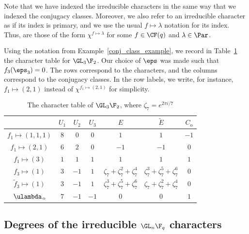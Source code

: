 Note that we have indexed the irreducible characters in the same way that we indexed the conjugacy classes.
Moreover, we also refer to an irreducible character as  if its index is primary, and we use the usual \(f \mapsto \lambda\) notation for its index.
Thus,  are those of the form \(\chi^{f \mapsto \lambda}\) for some \(f \in \CF (q)\) and \(\lambda \in \Par\).

\begin{example}
\label{runningexample}
Using the notation from Example~\ref{conj_class_example}, we record in Table~\ref{GL3F2_char_table} the character table for $\GL_3 \F_2$.
Our choice of \(\eps\) was made such that \(f_3(\eps_3) = 0\).
The rows correspond to the characters, and the columns correspond to the conjugacy classes.
In the row labels, we write, for instance, $f_1 \mapsto (2,1)$ instead of $\chi^{f_1 \mapsto (2,1)}$ for simplicity.

\begin{table}[ht]
\caption{The character table of \(\GL_3 \F_2\), where $\zeta_7 = e^{2 \pi i / 7}$}
\centering
\begin{tabular}{ c || c | c | c | c | c | c }
 & $U_1$ & $U_2$ & $U_3$ & $E$ & $\tilde{E}$ & $C_{\mathrm{o}}$ \\ \hline \hline
$f_1 \mapsto (1,1,1)$ & $8$ & $0$ & $0$ & $1$ & $1$ & $-1$  \\
$f_1 \mapsto (2,1)$ & $6$ & $2$ & $0$ & $-1$ & $-1$ & $0$ \\
$f_1 \mapsto (3)$ & $1$ & $1$ & $1$ & $1$ & $1$ & $1$ \\
$f_3 \mapsto (1)$ & $3$ & $-1$ & $1$ & $\zeta_7 + \zeta_7^2 + \zeta_7^4$ & $\zeta_7^3 + \zeta_7^5 + \zeta_7^6$ & $0$  \\
$\tilde{f}_3 \mapsto (1)$ & $3$ & $-1$ & $1$ & $\zeta_7^3 + \zeta_7^5 + \zeta_7^6$ & $\zeta_7 + \zeta_7^2 + \zeta_7^4$ & $0$  \\
$\ulambda_{\,\mathrm{o}}$ & $7$ & $-1$ & $-1$ & $0$ & $0$ & $1$  \\
\end{tabular}
\label{GL3F2_char_table}
\end{table}
\end{example}









\subsection{Degrees of the irreducible \texorpdfstring{$\GL_n \F_q$}{GLn Fq} characters}


